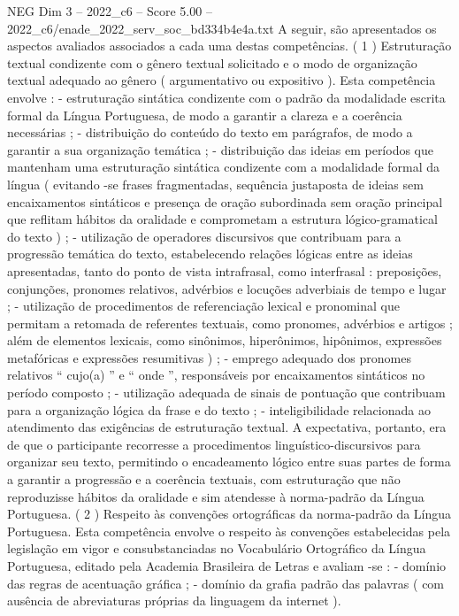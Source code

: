 \begin{textsample}{NEG Dim 3 – 2022\_c6 – Score 5.00 – 2022\_c6/enade\_2022\_serv\_soc\_bd334b4e4a.txt}
A seguir, são apresentados os aspectos avaliados associados a cada uma destas competências. ( 1 ) Estruturação textual condizente com o gênero textual solicitado e o modo de organização textual adequado ao gênero ( argumentativo ou expositivo ).
Esta competência envolve : - estruturação sintática condizente com o padrão da modalidade escrita formal da Língua Portuguesa, de modo a garantir a clareza e a coerência necessárias ; - distribuição do conteúdo do texto em parágrafos, de modo a garantir a sua organização temática ; - distribuição das ideias em períodos que mantenham uma estruturação sintática condizente com a modalidade formal da língua ( evitando -se frases fragmentadas, sequência justaposta de ideias sem encaixamentos sintáticos e presença de oração subordinada sem oração principal que reflitam hábitos da oralidade e comprometam a estrutura lógico-gramatical do texto ) ; - utilização de operadores discursivos que contribuam para a progressão temática do texto, estabelecendo relações lógicas entre as ideias apresentadas, tanto do ponto de vista intrafrasal, como interfrasal : preposições, conjunções, pronomes relativos, advérbios e locuções adverbiais de tempo e lugar ; - utilização de procedimentos de referenciação lexical e pronominal que permitam a retomada de referentes textuais, como pronomes, advérbios e artigos ; além de elementos lexicais, como sinônimos, hiperônimos, hipônimos, expressões metafóricas e expressões resumitivas ) ; - emprego adequado dos pronomes relativos “ cujo(a) ” e “ onde ”, responsáveis por encaixamentos sintáticos no período composto ; - utilização adequada de sinais de pontuação que contribuam para a organização lógica da frase e do texto ; - inteligibilidade relacionada ao atendimento das exigências de estruturação textual.
A expectativa, portanto, era de que o participante recorresse a procedimentos linguístico-discursivos para organizar seu texto, permitindo o encadeamento lógico entre suas partes de forma a garantir a progressão e a coerência textuais, com estruturação que não reproduzisse hábitos da oralidade e sim atendesse à norma-padrão da Língua Portuguesa. ( 2 ) Respeito às convenções ortográficas da norma-padrão da Língua Portuguesa.
Esta competência envolve o respeito às convenções estabelecidas pela legislação em vigor e consubstanciadas no Vocabulário Ortográfico da Língua Portuguesa, editado pela Academia Brasileira de Letras e avaliam -se : - domínio das regras de acentuação gráfica ; - domínio da grafia padrão das palavras ( com ausência de abreviaturas próprias da linguagem da internet ).

\end{textsample}
